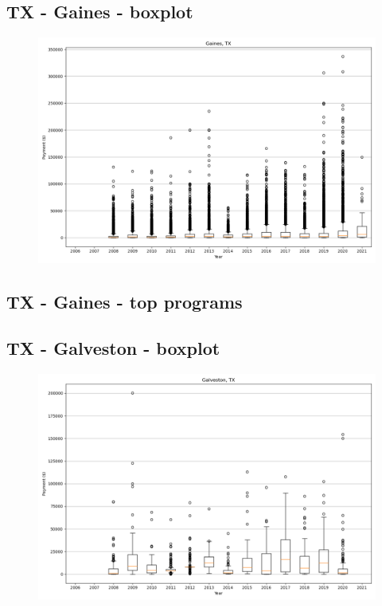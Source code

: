 \subsection*{TX - Gaines - boxplot}
\begin{figure}[h]
\centering
\includegraphics[width=7in]{../output/boxplots/counties/Gaines-TX_boxplot.png}
\end{figure}


\subsection*{TX - Gaines - top programs}

\newpage
\subsection*{TX - Galveston - boxplot}
\begin{figure}[h]
\centering
\includegraphics[width=7in]{../output/boxplots/counties/Galveston-TX_boxplot.png}
\end{figure}


